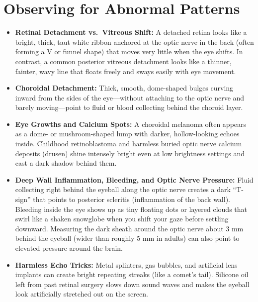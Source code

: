 \section{Observing for Abnormal Patterns}
\begin{itemize}
    \item \textbf{Retinal Detachment vs.\ Vitreous Shift:} A detached retina looks like a bright, thick, taut white ribbon anchored at the optic nerve in the back (often forming a V or funnel shape) that moves very little when the eye shifts. In contrast, a common posterior vitreous detachment looks like a thinner, fainter, wavy line that floats freely and sways easily with eye movement.
    \item \textbf{Choroidal Detachment:} Thick, smooth, dome-shaped bulges curving inward from the sides of the eye---without attaching to the optic nerve and barely moving---point to fluid or blood collecting behind the choroid layer.
    \item \textbf{Eye Growths and Calcium Spots:} A choroidal melanoma often appears as a dome- or mushroom-shaped lump with darker, hollow-looking echoes inside. Childhood retinoblastoma and harmless buried optic nerve calcium deposits (drusen) shine intensely bright even at low brightness settings and cast a dark shadow behind them.
    \item \textbf{Deep Wall Inflammation, Bleeding, and Optic Nerve Pressure:} Fluid collecting right behind the eyeball along the optic nerve creates a dark ``T-sign'' that points to posterior scleritis (inflammation of the back wall). Bleeding inside the eye shows up as tiny floating dots or layered clouds that swirl like a shaken snowglobe when you shift your gaze before settling downward. Measuring the dark sheath around the optic nerve about 3 mm behind the eyeball (wider than roughly 5 mm in adults) can also point to elevated pressure around the brain.
    \item \textbf{Harmless Echo Tricks:} Metal splinters, gas bubbles, and artificial lens implants can create bright repeating streaks (like a comet's tail). Silicone oil left from past retinal surgery slows down sound waves and makes the eyeball look artificially stretched out on the screen.
\end{itemize}


